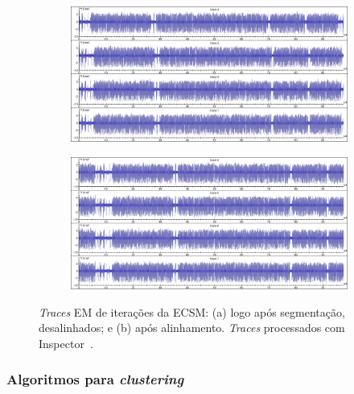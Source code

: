 \documentclass{SBCbookchapter}
\begin{document}
\begin{figure}
	\label{fig:traceAlignment}
	\centering
	\begin{subfigure}[b]{0.8\textwidth}
		\includegraphics[width=1\linewidth]{figures/Traces_EM___MontLadder___CPU_168MHz___SR_1GHz___28MS___Misaligned.png}
		\caption{}
		\label{fig:misaligned} 
	\end{subfigure}
	
	\begin{subfigure}[b]{0.8\textwidth}
		\includegraphics[width=1\linewidth]{figures/Traces_EM___MontLadder___CPU_168MHz___SR_1GHz___28MS___Aligned.png}
		\caption{}
		\label{fig:aligned}
	\end{subfigure}	
	
	\caption{\emph{Traces} EM de iterações da ECSM: (a) logo após segmentação, desalinhados; e (b) após alinhamento. \emph{Traces} processados com Inspector~\cite{RiscureInspector}.}
\end{figure}

\subsubsection{Algoritmos para \emph{clustering}}
\end{document}
